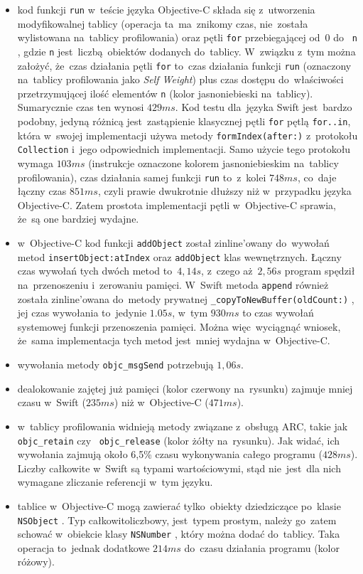 \documentclass[mgr, shortabstract]{iithesis}
\newcommand{\swiftinline}[1]{
    \texttt{#1}
}
\newcommand{\objcinline}[1]{
    \texttt{#1}
}
\begin{document}
\begin{itemize}
    \item kod funkcji \objcinline{run} w~teście języka Objective-C składa się z~utworzenia modyfikowalnej tablicy (operacja ta~ma~znikomy czas, nie~została wylistowana na~tablicy profilowania) oraz pętli \texttt{for} przebiegającej od~0 do~\objcinline{n}, gdzie \objcinline{n} jest~liczbą obiektów dodanych do~tablicy. W~związku z~tym można założyć, że~czas działania pętli \texttt{for} to~czas działania funkcji \objcinline{run} (oznaczony na~tablicy profilowania jako \textit{Self Weight}) plus czas dostępu do~właściwości przetrzymującej ilość elementów \objcinline{n} (kolor jasnoniebieski na~tablicy). Sumarycznie czas ten wynosi $429ms$. Kod testu dla~języka Swift jest~bardzo podobny, jedyną różnicą jest~zastąpienie klasycznej pętli \texttt{for} pętlą \texttt{for..in}, która w~swojej implementacji używa metody \swiftinline{formIndex(after:)} z~protokołu \swiftinline{Collection} i~jego odpowiednich implementacji. Samo użycie tego protokołu wymaga $103ms$ (instrukcje oznaczone kolorem jasnoniebieskim na~tablicy profilowania), czas działania samej funkcji \swiftinline{run} to~z~kolei $748ms$, co~daje łączny czas $851ms$, czyli prawie dwukrotnie dłuższy niż w~przypadku języka Objective-C. Zatem prostota implementacji pętli w~Objective-C sprawia, że~są one bardziej wydajne.
    \item w~Objective-C kod funkcji \objcinline{addObject} został zinline'owany do~wywołań metod \objcinline{insertObject:atIndex} oraz \objcinline{addObject} klas wewnętrznych. Łączny czas wywołań tych dwóch metod to~$4,14s$, z~czego aż $2,56s$ program spędził na~przenoszeniu i~zerowaniu pamięci. W~Swift metoda \swiftinline{append} również została zinline'owana do~metody prywatnej \swiftinline{_copyToNewBuffer(oldCount:)}, jej czas wywołania to~jedynie $1.05s$, w~tym $930ms$ to czas wywołań systemowej funkcji przenoszenia pamięci. Można więc~wyciągnąć wniosek, że~sama implementacja tych metod jest~mniej wydajna w~Objective-C.
    \item wywołania metody \objcinline{objc_msgSend} potrzebują $1,06s$.
    \item dealokowanie zajętej już pamięci (kolor czerwony na~rysunku) zajmuje mniej czasu w~Swift ($235ms$) niż w~Objective-C ($471ms$).
    \item w~tablicy profilowania widnieją metody związane z~obsługą ARC, takie jak \objcinline{objc_retain} czy~\objcinline{objc_release} (kolor żółty na~rysunku). Jak widać, ich wywołania zajmują około 6,5\% czasu wykonywania całego programu ($428ms$). Liczby całkowite w~Swift są typami wartościowymi, stąd nie~jest~dla nich wymagane zliczanie referencji w~tym języku.
    \item tablice w~Objective-C mogą zawierać tylko~obiekty dziedziczące po~klasie \objcinline{NSObject}. Typ całkowitoliczbowy, jest~typem prostym, należy go~zatem schować w~obiekcie klasy \objcinline{NSNumber}, który można dodać do~tablicy. Taka operacja to~jednak dodatkowe $214ms$ do~czasu działania programu (kolor różowy).
\end{itemize}
\end{document}
